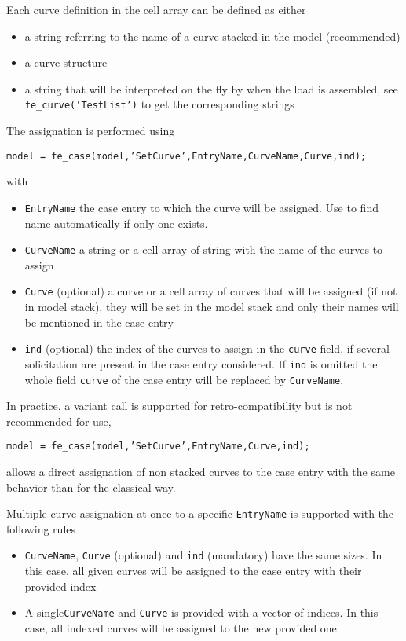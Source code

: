 Each curve definition in the cell array can be defined as either
\begin{itemize}
\item a string referring to the name of a curve stacked in the model (recommended)
\item a curve structure
\item a string that will be interpreted on the fly by \fecurve when the load is assembled, see {\tt fe\_curve('TestList')} to get the corresponding strings
\end{itemize}

The assignation is performed using 

{\tt model = fe\_case(model,'SetCurve',EntryName,CurveName,Curve,ind);}

with
\begin{itemize}
\item {\tt EntryName} the case entry to which the curve will be assigned. Use  to find name automatically if only one exists. 
\item {\tt CurveName} a string or a cell array of string with the name of the curves to assign
\item {\tt Curve} (optional)  a curve or a cell array of curves that will be assigned (if not in model stack), they will be set in the model stack and only their names will be mentioned in the case entry
\item {\tt ind} (optional) the index of the curves to assign in the {\tt curve} field, if several solicitation are present in the case entry considered. If {\tt ind} is omitted the whole field {\tt curve} of the case entry will be replaced by {\tt CurveName}.
\end{itemize}

In practice, a variant call is supported for retro-compatibility but is not recommended for use,

{\tt model = fe\_case(model,'SetCurve',EntryName,Curve,ind);}

allows a direct assignation of non stacked curves to the case entry with the same behavior than for the classical way.

\vs

Multiple curve assignation at once to a specific {\tt EntryName} is supported with the following rules
\begin{itemize}
\item {\tt CurveName}, {\tt Curve} (optional) and {\tt ind} (mandatory) have the same sizes. In this case, all given curves will be assigned to the case entry with their provided index
\item A single{\tt CurveName} and {\tt Curve} is provided with a vector of indices. In this case, all indexed curves will be assigned to the new provided one
\end{itemize}

